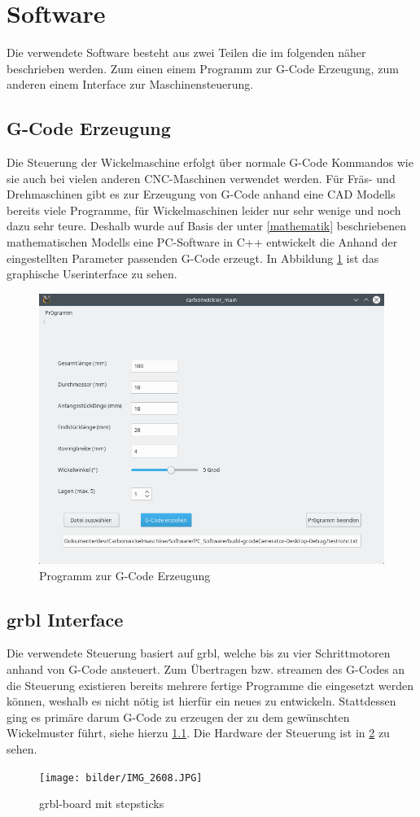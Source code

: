 \documentclass[paper=A4,pagesize,DIV=18, 12pt,listof=totoc,bibliography=totoc,headings=optiontohead,open=any]{article}
\begin{document}
\section{Software}
Die verwendete Software besteht aus zwei Teilen die im folgenden näher beschrieben werden. Zum einen einem Programm zur G-Code Erzeugung, zum anderen einem Interface zur Maschinensteuerung.
\subsection{G-Code Erzeugung}
\label{software}
Die Steuerung der Wickelmaschine erfolgt über normale G-Code Kommandos wie sie auch bei vielen anderen CNC-Maschinen verwendet werden. Für Fräs- und Drehmaschinen gibt es zur Erzeugung von G-Code anhand eine CAD Modells bereits viele Programme, für Wickelmaschinen leider nur sehr wenige und noch dazu sehr teure. Deshalb wurde auf Basis der unter \ref{mathematik} beschriebenen mathematischen Modells eine PC-Software in C++ entwickelt die  Anhand der eingestellten Parameter passenden G-Code erzeugt. In Abbildung \ref{fig:g-code} ist das graphische Userinterface zu sehen. 
\begin{figure}[H]
	\centering
	\includegraphics[width=1\textwidth]{bilder/carbowickler_software.png}
	\caption{Programm zur G-Code Erzeugung} 
	\label{fig:g-code}
\end{figure}


\subsection{grbl Interface}
Die verwendete Steuerung basiert auf grbl\cite{grbl}, welche bis zu vier Schrittmotoren anhand von G-Code ansteuert. Zum Übertragen bzw. streamen des G-Codes an die Steuerung existieren bereits mehrere fertige Programme die eingesetzt werden können, weshalb es nicht nötig ist hierfür ein neues zu entwickeln. Stattdessen ging es primäre darum G-Code zu erzeugen der zu dem gewünschten Wickelmuster führt, siehe hierzu \ref{software}. Die Hardware der Steuerung ist in \ref{fig:grbl_board} zu sehen.
\begin{figure}[H]
	\centering
	\texttt{[image: bilder/IMG\_2608.JPG]}
	\caption{grbl-board mit stepsticks} 
	\label{fig:grbl_board}
\end{figure}

\newpage
\printbibliography
\end{document}
